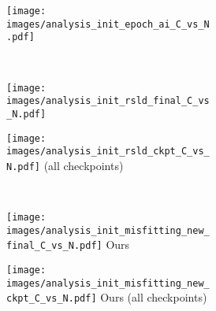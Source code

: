 \begin{figure}[]
\ContinuedFloat
\centering 
\begin{subfigure}{\textwidth}
\begin{subfigure}{0.49\textwidth}
    \centering
    \texttt{[image: images/analysis\_init\_epoch\_ai\_C\_vs\_N.pdf]}
    \footnotesize{\citet{hoffmann2022training,besiroglu2024chinchilla}}
\end{subfigure}
\\ \vspace{1em}
\begin{subfigure}{0.49\textwidth}
    \centering
    \texttt{[image: images/analysis\_init\_rsld\_final\_C\_vs\_N.pdf]}
    \footnotesize{\citet{porian2024resolving}}
\end{subfigure}
\hfill
\begin{subfigure}{0.49\textwidth}
    \centering
    \texttt{[image: images/analysis\_init\_rsld\_ckpt\_C\_vs\_N.pdf]}
    \footnotesize{\citet{porian2024resolving} (all checkpoints)}
\end{subfigure}
\\ \vspace{1em}
    \centering
\begin{subfigure}{0.49\textwidth}
    \centering
    \texttt{[image: images/analysis\_init\_misfitting\_new\_final\_C\_vs\_N.pdf]}
    \footnotesize{Ours}
\end{subfigure}
\hfill
\begin{subfigure}{0.49\textwidth}
    \centering
    \texttt{[image: images/analysis\_init\_misfitting\_new\_ckpt\_C\_vs\_N.pdf]}
    \footnotesize{Ours (all checkpoints)}
\end{subfigure}
\\ \vspace{1em}

\end{subfigure}
\end{figure}

